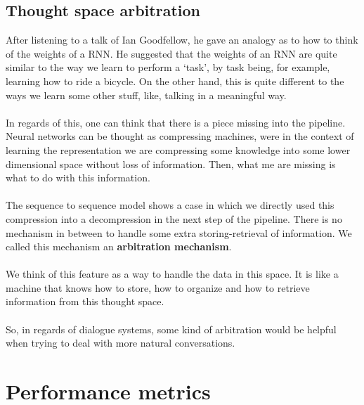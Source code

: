 \documentclass{llncs}
\begin{document}
\subsection{Thought space arbitration}

After listening to a talk of Ian Goodfellow, he gave an analogy as to how to think of the weights of a RNN. He suggested that the weights of an RNN are quite similar to the way we learn to perform a `task', by task being, for example, learning how to ride a bicycle. On the other hand, this is quite different to the ways we learn some other stuff, like, talking in a meaningful way.
\\
\\
In regards of this, one can think that there is a piece missing into the pipeline. Neural networks can be thought as compressing machines, were in the context of learning the representation we are compressing some knowledge into some lower dimensional space without loss of information. Then, what me are missing is what to do with this information.
\\
\\
The sequence to sequence model shows a case in which we directly used this compression into a decompression in the next step of the pipeline. There is no mechanism in between to handle some extra storing-retrieval of information. We called this mechanism an \textbf{arbitration mechanism}.
\\
\\
We think of this feature as a way to handle the data in this space. It is like a machine that knows how to store, how to organize and how to retrieve information from this thought space.
\\
\\ 
So, in regards of dialogue systems, some kind of arbitration would be helpful when trying to deal with more natural conversations.

\section{Performance metrics}
\end{document}
